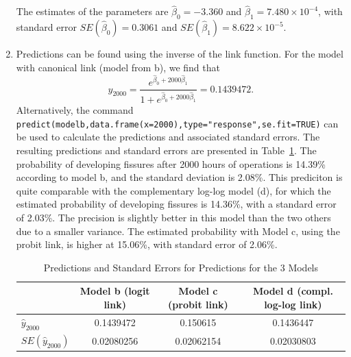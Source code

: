 \begin{solution}{2.9}
\begin{enumerate}
The estimates of the parameters are $\hat{\beta}_{0}=-3.360$ and $\hat{\beta}_{1}=7.480\times10^{-4}$, with standard error $SE(\hat{\beta}_{0})=0.3061$ and $SE(\hat{\beta}_{1})=8.622\times10^{-5}$.

\item Predictions can be found using the inverse of the link function. For the model with canonical link (model from b), we find that $$\hat{y}_{2000}=\frac{e^{\hat{\beta}_{0}+2000\hat{\beta}_{1}}}{1+e^{\hat{\beta}_{0}+2000\hat{\beta}_{1}}}=0.1439472.$$ Alternatively, the command \texttt{predict(modelb,data.frame(x=2000),type="response",se.fit=TRUE)} can be used to calculate the predictions and associated standard errors. The resulting predictions and standard errors are presented in Table~\ref{tab:glm:pred}. The probability of developing fissures after 2000 hours of operations is 14.39\% according to model b, and the standard deviation is 2.08\%. This prediciton is quite comparable with the complementary log-log model (d), for which the estimated probability of developing fissures is 14.36\%, with a standard error of 2.03\%. The precision is slightly better in this model than the two others due to a smaller variance. The estimated probability with Model c, using the probit link, is higher at 15.06\%, with standard error of 2.06\%.
\begin{table}[htbp]
\begin{center}
\begin{tabular}{|l||c|c|c|}
  \hline
   & Model b (logit link) & Model c (probit link) & Model d (compl. log-log link) \\
  \hline
  \hline
	 $\hat{y}_{2000}$ &0.1439472 & 0.150615 & 0.1436447\\ \hline
	 $SE(\hat{y}_{2000})$ &0.02080256 & 0.02062154 & 0.02030803 \\ \hline
\end{tabular}
\caption{Predictions and Standard Errors for Predictions for the 3 Models} \label{tab:glm:pred}
\end{center}
\end{table}


\end{enumerate}
\end{solution}

